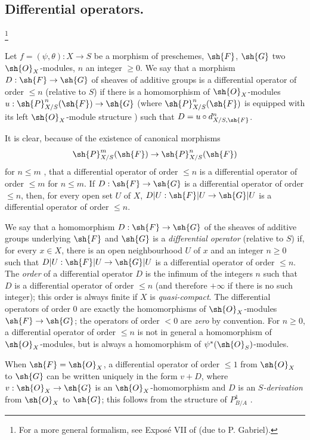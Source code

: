 \subsection{Differential operators.}
\footnote{
  For a more general formalism, see Expos\'e VII of \cite{IV-42} (due to P. Gabriel).
}
\label{IV.16.8}

\begin{definition}[16.8.1]
\label{IV.16.8.1}
Let $f = (\psi, \theta): X \to S$ be a morphism of preschemes, $\sh{F}$, $\sh{G}$ two $\sh{O}_X$-modules, $n$ an integer $\geq 0$.
We say that a morphism $D: \sh{F} \to \sh{G}$ of sheaves of additive groups is a differential operator of order $\leq n$ (relative to $S$) if there is a homomorphism of $\sh{O}_X$-modules $u: \sh{P}_{X/S}^n(\sh{F}) \to \sh{G}$ (where $\sh{P}_{X/S}^n(\sh{F})$ is equipped with its left $\sh{O}_X$-module structure ) such that $D = u \circ d_{X/S, \sh{F}}^n$.
\end{definition}

It is clear, because of the existence of canonical morphisms
\[
  \sh{P}_{X/S}^m(\sh{F}) \to \sh{P}_{X/S}^n(\sh{F})
\] 
for $n \leq m$ , that a differential operator of order $\leq n$ is a differential operator of order $\leq m$ for $n \leq m$.
If $D:\sh{F} \to \sh{G}$ is a differential operator of order $\leq n$, then, for every open set $U$ of $X$, $D|U: \sh{F}|U \to \sh{G}|U$ is a differential operator of order $\leq n$.

We say that a homomorphism $D: \sh{F} \to \sh{G}$ of the sheaves of additive groups underlying $\sh{F}$ and $\sh{G}$ is a \emph{differential operator} (relative to $S$) if, for every $x \in X$, there is an open neighbourhood $U$ of $x$ and an integer $n \geq 0$ such that $D|U: \sh{F}|U \to \sh{G}|U$ is a differential operator of order $\leq n$.
The \emph{order} of a differential operator $D$ is the infimum of the integers $n$ such that $D$ is a differential operator of order $\leq n$ (and therefore $+\infty$ if there is no such integer);
this order is always finite if $X$ is \emph{quasi-compact}.
The differential operators of order $0$ are exactly the homomorphisms of $\sh{O}_X$-modules $\sh{F} \to \sh{G}$;
the operators of order $<0$ are \emph{zero} by convention.
For $n \geq 0$, a differential operator of order $\leq n$ is not in general a homomorphism of $\sh{O}_X$-modules, but is always a homomorphism of $\psi^*(\sh{O}_S)$-modules.

When $\sh{F} = \sh{O}_X$, a differential operator of order $\leq 1$ from $\sh{O}_X$ to $\sh{G}$ can be written uniquely in the form $v + D$, where $v: \sh{O}_X \to \sh{G}$ is an $\sh{O}_X$-homomorphism and $D$ is an \emph{$S$-derivation}  from $\sh{O}_X$ to $\sh{G}$; this follows from the structure of $P_{B/A}^1$ .

